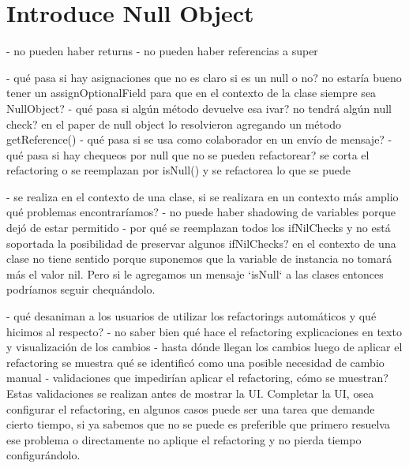 \section{Introduce Null Object}



- no pueden haber returns
- no pueden haber referencias a super


- qué pasa si hay asignaciones que no es claro si es un null o no?
no estaría bueno tener un assignOptionalField para que en el contexto de la clase siempre sea NullObject?
- qué pasa si algún método devuelve esa ivar? no tendrá algún null check?
en el paper de null object lo resolvieron agregando un método getReference()
- qué pasa si se usa como colaborador en un envío de mensaje?
- qué pasa si hay chequeos por null que no se pueden refactorear?
se corta el refactoring o se reemplazan por isNull() y se refactorea lo que se puede

- se realiza en el contexto de una clase, si se realizara en un contexto más amplio qué problemas encontraríamos?
- no puede haber shadowing de variables porque dejó de estar permitido
- por qué se reemplazan todos los ifNilChecks y no está soportada la posibilidad de preservar algunos ifNilChecks? 
en el contexto de una clase no tiene sentido porque suponemos que la variable de instancia no
tomará más el valor nil. Pero si le agregamos un mensaje `isNull` a las clases entonces
podríamos seguir chequándolo. 




- qué desaniman a los usuarios de utilizar los refactorings automáticos y qué hicimos al respecto?
    - no saber bien qué hace el refactoring
    explicaciones en texto y visualización de los cambios
    - hasta dónde llegan los cambios
    luego de aplicar el refactoring se muestra qué se identificó como una posible necesidad de cambio manual
- validaciones que impedirían aplicar el refactoring, cómo se muestran? Estas validaciones se
realizan antes de mostrar la UI. Completar la UI, osea configurar el refactoring, en algunos
casos puede ser una tarea que demande cierto tiempo, si ya sabemos que no se puede es preferible
que primero resuelva ese problema o directamente no aplique el refactoring y no pierda tiempo
configurándolo.



